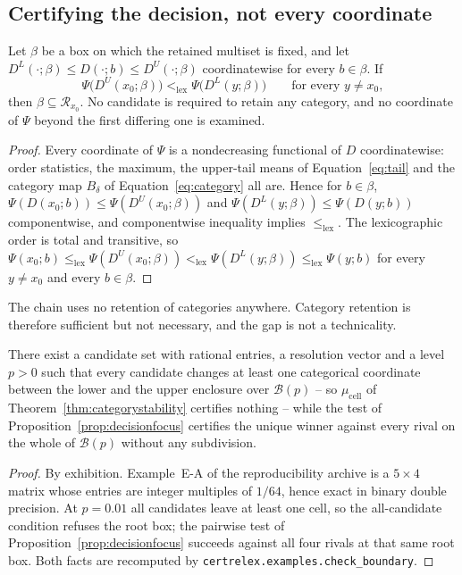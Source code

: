 \subsection{Certifying the decision, not every coordinate}
\begin{proposition}
\label{prop:decisionfocus}
Let $\beta$ be a box on which the retained multiset is fixed, and let
$D^L(\cdot;\beta)\le D(\cdot;b)\le D^U(\cdot;\beta)$ coordinatewise for every
$b\in\beta$. If
\[
\Psi\bigl(D^U(x_0;\beta)\bigr)<_{\mathrm{lex}}\Psi\bigl(D^L(y;\beta)\bigr)
\qquad\text{for every }y\neq x_0,
\]
then $\beta\subseteq\mathcal R_{x_0}$. No candidate is required to retain any
category, and no coordinate of $\Psi$ beyond the first differing one is
examined.
\end{proposition}
\begin{proof}
Every coordinate of $\Psi$ is a nondecreasing functional of $D$
coordinatewise: order statistics, the maximum, the upper-tail means of
Equation~\eqref{eq:tail} and the category map $B_\delta$ of
Equation~\eqref{eq:category} all are. Hence for $b\in\beta$,
$\Psi(D(x_0;b))\le\Psi(D^U(x_0;\beta))$ and
$\Psi(D^L(y;\beta))\le\Psi(D(y;b))$ componentwise, and componentwise
inequality implies $\le_{\mathrm{lex}}$. The lexicographic order is total and
transitive, so
$\Psi(x_0;b)\le_{\mathrm{lex}}\Psi(D^U(x_0;\beta))<_{\mathrm{lex}}
\Psi(D^L(y;\beta))\le_{\mathrm{lex}}\Psi(y;b)$ for every $y\ne x_0$ and every
$b\in\beta$.
\end{proof}

The chain uses no retention of categories anywhere. Category retention is
therefore sufficient but not necessary, and the gap is not a technicality.

\begin{proposition}
\label{prop:vacuous}
There exist a candidate set with rational entries, a resolution vector and a
level $p>0$ such that every candidate changes at least one categorical
coordinate between the lower and the upper enclosure over
$\mathcal B(p)$ -- so $\mu_{\mathrm{cell}}$ of
Theorem~\ref{thm:categorystability} certifies nothing -- while the test of
Proposition~\ref{prop:decisionfocus} certifies the unique winner against every
rival on the whole of $\mathcal B(p)$ without any subdivision.
\end{proposition}
\begin{proof}
By exhibition. Example~E-A of the reproducibility archive is a
$5\times4$ matrix whose entries are integer multiples of $1/64$, hence exact in
binary double precision. At $p=0.01$ all \crxExampleALeaving{} candidates leave
at least one cell, so the all-candidate condition refuses the root box; the
pairwise test of Proposition~\ref{prop:decisionfocus} succeeds against all four
rivals at that same root box. Both facts are recomputed by
\texttt{certrelex.examples.check\_boundary}.
\end{proof}

